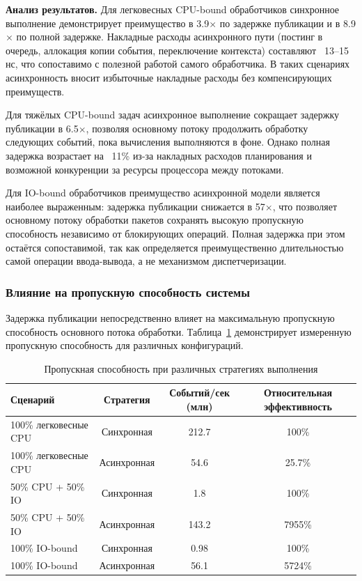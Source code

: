 \textbf{Анализ результатов.} Для легковесных CPU-bound обработчиков синхронное выполнение демонстрирует преимущество в 3.9$\times$ по задержке публикации и в 8.9$\times$ по полной задержке. Накладные расходы асинхронного пути (постинг в очередь, аллокация копии события, переключение контекста) составляют ~13--15 нс, что сопоставимо с полезной работой самого обработчика. В таких сценариях асинхронность вносит избыточные накладные расходы без компенсирующих преимуществ.

Для тяжёлых CPU-bound задач асинхронное выполнение сокращает задержку публикации в 6.5$\times$, позволяя основному потоку продолжить обработку следующих событий, пока вычисления выполняются в фоне. Однако полная задержка возрастает на ~11\% из-за накладных расходов планирования и возможной конкуренции за ресурсы процессора между потоками.

Для IO-bound обработчиков преимущество асинхронной модели является наиболее выраженным: задержка публикации снижается в 57$\times$, что позволяет основному потоку обработки пакетов сохранять высокую пропускную способность независимо от блокирующих операций. Полная задержка при этом остаётся сопоставимой, так как определяется преимущественно длительностью самой операции ввода-вывода, а не механизмом диспетчеризации.

\subsubsection{Влияние на пропускную способность системы}

Задержка публикации непосредственно влияет на максимальную пропускную способность основного потока обработки. Таблица~\ref{tab:throughput_comparison} демонстрирует измеренную пропускную способность для различных конфигураций.

\begin{table}[H]
\centering
\footnotesize
\caption{Пропускная способность при различных стратегиях выполнения}
\label{tab:throughput_comparison}
\begin{tabular}{lccc}
\toprule
\textbf{Сценарий} & \textbf{Стратегия} & \textbf{Событий/сек (млн)} & \textbf{Относительная эффективность} \\
\midrule
100\% легковесные CPU & Синхронная & 212.7 & 100\% \\
100\% легковесные CPU & Асинхронная & 54.6 & 25.7\% \\
\midrule
50\% CPU + 50\% IO & Синхронная & 1.8 & 100\% \\
50\% CPU + 50\% IO & Асинхронная & 143.2 & 7955\% \\
\midrule
100\% IO-bound & Синхронная & 0.98 & 100\% \\
100\% IO-bound & Асинхронная & 56.1 & 5724\% \\
\bottomrule
\end{tabular}
\end{table}

